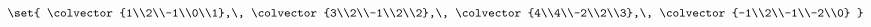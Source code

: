 $\set{
\colvector{1\\2\\-1\\0\\1},\,
\colvector{3\\2\\-1\\2\\2},\,
\colvector{4\\4\\-2\\2\\3},\,
\colvector{-1\\2\\-1\\-2\\0}
}$